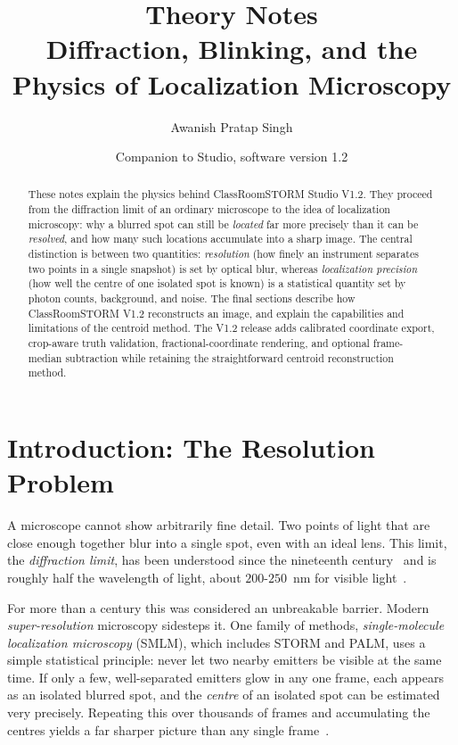 \documentclass[11pt,a4paper]{article}
\title{\textbf{\app{} Theory Notes}\\[2pt]\large Diffraction, Blinking, and the
       Physics of Localization Microscopy}
\author{Awanish Pratap Singh}
\date{Companion to \app{} Studio, software version 1.2}
\newcommand{\app}{ClassRoomSTORM}
\begin{document}
\maketitle
\thispagestyle{empty}

\begin{abstract}
\noindent These notes explain the physics behind \app{} Studio V1.2. They proceed from the diffraction limit of an ordinary microscope to the idea of
localization microscopy: why a blurred spot can still be \emph{located} far more
precisely than it can be \emph{resolved}, and how many such locations accumulate
into a sharp image. The central distinction is between two quantities: \emph{resolution} (how finely an instrument separates two points in a single snapshot) is set by optical blur, whereas \emph{localization precision} (how well the centre of one isolated spot is known) is a
statistical quantity set by photon counts, background, and noise. The final
sections describe how \app{} V1.2 reconstructs an image, and explain the capabilities and limitations of the centroid method. The V1.2 release adds
calibrated coordinate export, crop-aware truth validation, fractional-coordinate
rendering, and optional frame-median subtraction while retaining the straightforward centroid reconstruction method.
\end{abstract}

\begingroup\small\tableofcontents\endgroup
\newpage

\section{Introduction: The Resolution Problem}
\label{sec:intro}

A microscope cannot show arbitrarily fine detail. Two points of light that are
close enough together blur into a single spot, even with an ideal lens.
This limit, the \emph{diffraction limit}, has been understood since the
nineteenth century~\cite{abbe1873} and is roughly half the wavelength of
light, about $200$-$250$~nm for visible light~\cite{bechhoefer2015,
schermelleh2019}.

For more than a century this was considered an unbreakable barrier. Modern
\emph{super-resolution} microscopy sidesteps it. One family of methods, \emph{single-molecule localization microscopy} (SMLM), which includes STORM and PALM, uses a simple statistical principle: never let two nearby
emitters be visible at the same time. If only a few, well-separated emitters
glow in any one frame, each appears as an isolated blurred spot, and the
\emph{centre} of an isolated spot can be estimated very precisely. Repeating this
over thousands of frames and accumulating the centres yields a far sharper
picture than any single frame~\cite{huang2010, sigal2018}.
\end{document}
